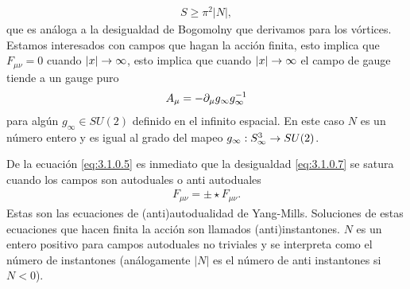 \begin{align}
	S\geq\pi^2|N|, \label{eq:3.1.0.7}
\end{align}
que es análoga a la desigualdad de Bogomolny que derivamos para los vórtices. Estamos interesados con campos que hagan la acción finita, esto implica que $F_{\mu\nu}=0$ cuando $|x|\rightarrow\infty$, esto implica que cuando $|x|\rightarrow\infty$ el campo de gauge tiende a un gauge puro
\begin{align}
	A_\mu = -\partial_\mu g_{\infty}g_\infty^{-1} \label{eq:3.1.0.7}
\end{align}
para algún $g_\infty\in SU(2)$ definido en el infinito espacial. En este caso $N$ es un número entero y es igual al grado del mapeo $g_\infty: S_\infty^3\rightarrow SU(2)$.

De la ecuación \eqref{eq:3.1.0.5} es inmediato que la desigualdad \eqref{eq:3.1.0.7} se satura cuando los campos son autoduales o anti autoduales
\begin{align}
	F_{\mu\nu} = \pm\star F_{\mu\nu}. \label{eq:3.1.0.8}
\end{align}
Estas son las ecuaciones de (anti)autodualidad de Yang-Mills. Soluciones de estas ecuaciones que hacen finita la acción son llamados (anti)instantones. $N$ es un entero positivo para campos autoduales no triviales y se interpreta como el número de instantones (análogamente $|N|$ es el número de anti instantones si $N<0$).

